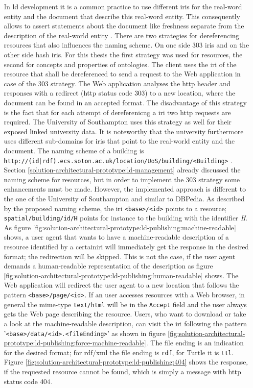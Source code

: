 \documentclass[draft,final]{vutinfth} %
\begin{document}
In \gls{ld} development it is a common practice to use different \gls{iri}s for the real-word entity and the document that describe this real-word entity. This consequently allows to assert statements about the document like freshness separate from   the description of the real-world entity \cite{bizer_linked_2009}. There are two strategies for dereferencing resources that also influences the naming scheme. On one side 303 \gls{iri}s and on the other side hash \gls{iri}s. For this thesis the first strategy was used for resources, the second for concepts and properties of ontologies. 
The client uses the \gls{iri} of the resource that shall be dereferenced to send a request to the Web application in case of the 303 strategy. The Web application analyses the \gls{http} header and responses with a redirect (\gls{http} status code 303) to a new location, where the document can be found in an accepted format. The disadvantage of this strategy is the fact that for each attempt of dereferenicng a \gls{iri} two \gls{http} requests are required. The University of Southampton uses this strategy as well for their exposed linked university data. It is noteworthy that the university furthermore uses different sub-domains for \gls{iri}s that point to the real-world entity and the document. The naming scheme of a building is \texttt{http://(id|rdf).ecs.soton.ac.uk/location/UoS/building/<Building>} \cite{cobden_ecs_????}. Section \ref{solution-architectural-prototype:ld-management} already discussed the naming scheme for resources, but in order to implement the 303 strategy some enhancements must be made. However, the implemented approach is different to the one of the University of Southampton and similar to DBPedia. As described by the proposed naming scheme, the \gls{iri} \texttt{<base>/<id>} points to a resource; \texttt{spatial/building/id/H} points for instance to the building with the identifier \textit{H}. As figure \ref{fig:solution-architectural-prototype:ld-publishing:machine-readable} shows, a user agent that wants to have a machine-readable description of a resource identified by a certain\gls{iri} will immediately get the response in the desired format; the redirection will be skipped. This is not the case, if the user agent demands a human-readable representation of the description as figure \ref{fig:solution-architectural-prototype:ld-publishing:human-readable} shows. The Web application will redirect the user agent to a new location that follows the pattern \texttt{<base>/page/<id>}. If an user accesses resources with a Web browser, in general the mime-type \texttt{text/html} will be in the \texttt{Accept} field and the user always gets the Web page describing the resource. Users, who want to download or take a look at the machine-readable description, can visit the \gls{iri} following the pattern '\texttt{<base>/data/<id>.<fileEnding>}' as shown in figure \ref{fig:solution-architectural-prototype:ld-publishing:force-machine-readable}. The file ending is an indication for the desired format; for \gls{rdf}/\gls{xml} the file ending is \texttt{rdf}, for Turtle it is \texttt{ttl}. Figure \ref{fig:solution-architectural-prototype:ld-publishing:404} shows the response, if the requested resource cannot be found, which is simply a message with \gls{http} status code 404.
\end{document}
